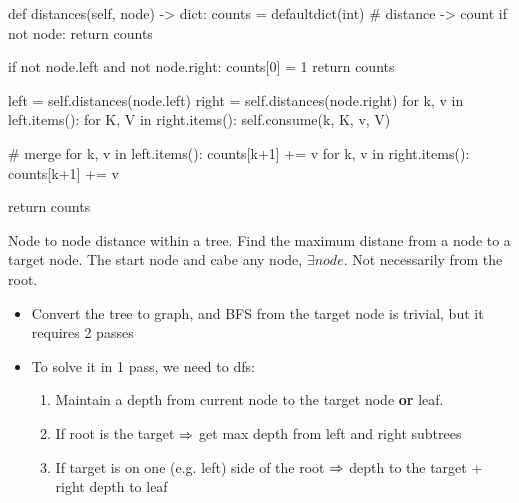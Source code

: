 \begin{python}
def distances(self, node) -> dict:
    counts = defaultdict(int)  # distance -> count
    if not node:
        return counts
    
    if not node.left and not node.right:
        counts[0] = 1
        return counts

    left = self.distances(node.left)
    right = self.distances(node.right) 
    for k, v in left.items():
        for K, V in right.items():
            self.consume(k, K, v, V)
    
    # merge
    for k, v in left.items():
        counts[k+1] += v
    for k, v in right.items():
        counts[k+1] += v

    return counts
\end{python}

 Node to node distance within a tree. Find the maximum distane from a node to a target node. The start node and cabe any node, $\exists node$. Not necessarily from the root.

\begin{center}
\end{center}

\begin{itemize}
\item Convert the tree to graph, and BFS from the target node is trivial, but it requires 2 passes
\item To solve it in 1 pass, we need to dfs:
\begin{enumerate}
\item Maintain a depth from current node to the target node \textbf{or} leaf.
\item If root is the target $\Rightarrow$ get max depth from left and right subtrees 
\item If target is on one (e.g. left) side of the root $\Rightarrow$ depth to the target + right depth to leaf
\end{enumerate}
\end{itemize}

